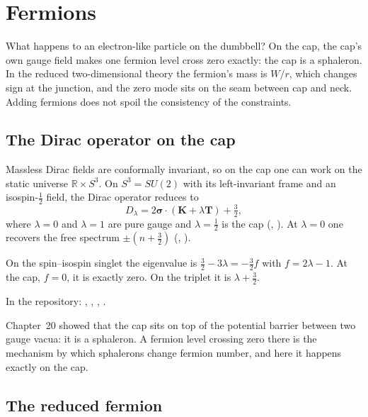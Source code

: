 \chapter{Fermions}\label{ch:fermions}

\begin{questionbox}
What happens to an electron-like particle on the dumbbell? On the cap, the cap's own gauge field makes one fermion level cross zero exactly: the cap is a sphaleron. In the reduced two-dimensional theory the fermion's mass is $W/r$, which changes sign at the junction, and the zero mode sits on the seam between cap and neck. Adding fermions does not spoil the consistency of the constraints.
\end{questionbox}

\section{The Dirac operator on the cap}

Massless Dirac fields are conformally invariant, so on the cap one can work on the static universe $\mathbb R\times S^3$. On $S^3=SU(2)$ with its left-invariant frame and an isospin-$\tfrac12$ field, the Dirac operator reduces to
\[
D_\lambda=2\boldsymbol\sigma\cdot(\mathbf K+\lambda\mathbf T)+\tfrac32 ,
\]
where $\lambda=0$ and $\lambda=1$ are pure gauge and $\lambda=\tfrac12$ is the cap (, ). At $\lambda=0$ one recovers the free spectrum $\pm(n+\tfrac32)$ (, ).

\begin{theorem}\proved
On the spin--isospin singlet the eigenvalue is $\tfrac32-3\lambda=-\tfrac32f$ with $f=2\lambda-1$. At the cap, $f=0$, it is exactly zero. On the triplet it is $\lambda+\tfrac32$.
\end{theorem}
\noindent In the repository: , , , .

Chapter~20 showed that the cap sits on top of the potential barrier between two gauge vacua: it is a sphaleron. A fermion level crossing zero there is the mechanism by which sphalerons change fermion number, and here it happens exactly on the cap.

\section{The reduced fermion}

